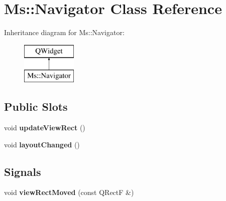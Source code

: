 \hypertarget{class_ms_1_1_navigator}{}\section{Ms\+:\+:Navigator Class Reference}
\label{class_ms_1_1_navigator}
Inheritance diagram for Ms\+:\+:Navigator\+:\begin{figure}[H]
\begin{center}
\leavevmode
\includegraphics[height=2.000000cm]{class_ms_1_1_navigator}
\end{center}
\end{figure}
\subsection*{Public Slots}
\begin{DoxyCompactItemize}
\item 
\mbox{\label{class_ms_1_1_navigator_a5565cd3b166984b0a5d3716b3a2f43e2}} 
void {\bfseries update\+View\+Rect} ()
\item 
\mbox{\label{class_ms_1_1_navigator_a651e38538248c8d1b4925715d2118a9c}} 
void {\bfseries layout\+Changed} ()
\end{DoxyCompactItemize}
\subsection*{Signals}
\begin{DoxyCompactItemize}
\item 
\mbox{\label{class_ms_1_1_navigator_aa76a587bfc09f420f6a0d6009fbf5632}} 
void {\bfseries view\+Rect\+Moved} (const Q\+RectF \&)
\end{DoxyCompactItemize}

